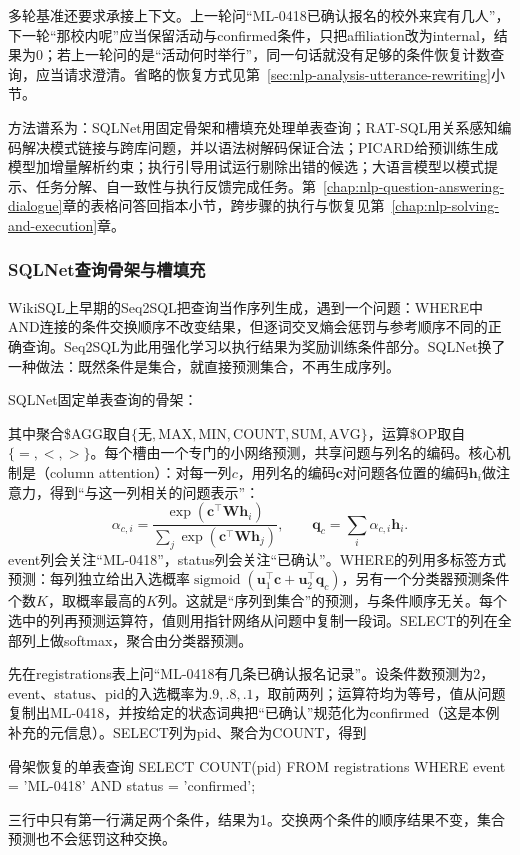 多轮基准还要求承接上下文。上一轮问“ML-0418已确认报名的校外来宾有几人”，下一轮“那校内呢”应当保留活动与confirmed条件，只把affiliation改为internal，结果为0；若上一轮问的是“活动何时举行”，同一句话就没有足够的条件恢复计数查询，应当请求澄清。省略的恢复方式见第~\ref{sec:nlp-analysis-utterance-rewriting}小节。

方法谱系为：SQLNet用固定骨架和槽填充处理单表查询；RAT-SQL用关系感知编码解决模式链接与跨库问题，并以语法树解码保证合法；PICARD给预训练生成模型加增量解析约束；执行引导用试运行剔除出错的候选；大语言模型以模式提示、任务分解、自一致性与执行反馈完成任务。第~\ref{chap:nlp-question-answering-dialogue}章的表格问答回指本小节，跨步骤的执行与恢复见第~\ref{chap:nlp-solving-and-execution}章。

\subsubsection{SQLNet查询骨架与槽填充}
\label{sec:nlp-analysis-sqlnet}

WikiSQL上早期的Seq2SQL把查询当作序列生成，遇到一个问题：WHERE中AND连接的条件交换顺序不改变结果，但逐词交叉熵会惩罚与参考顺序不同的正确查询。Seq2SQL为此用强化学习以执行结果为奖励训练条件部分。SQLNet换了一种做法：既然条件是集合，就直接预测集合，不再生成序列。

SQLNet固定单表查询的骨架：
其中聚合\$AGG取自$\{,,,,,\}$，运算\$OP取自$\{=,<,>\}$。每个槽由一个专门的小网络预测，共享问题与列名的编码。核心机制是（column attention）：对每一列$c$，用列名的编码$\bm c$对问题各位置的编码$\bm h_i$做注意力，得到“与这一列相关的问题表示”：
\[
 \alpha_{c,i}=
 \frac{\exp(\bm c^{\top}\bm W\bm h_i)}
      {\sum_j\exp(\bm c^{\top}\bm W\bm h_j)},\qquad
 \bm q_c=\sum_i\alpha_{c,i}\bm h_i.
\]
event列会关注“ML-0418”，status列会关注“已确认”。WHERE的列用多标签方式预测：每列独立给出入选概率$(\bm u_1^{\top}\bm c+\bm u_2^{\top}\bm q_c)$，另有一个分类器预测条件个数$K$，取概率最高的$K$列。这就是“序列到集合”的预测，与条件顺序无关。每个选中的列再预测运算符，值则用指针网络从问题中复制一段词。SELECT的列在全部列上做softmax，聚合由分类器预测。

先在registrations表上问“ML-0418有几条已确认报名记录”。设条件数预测为2，event、status、pid的入选概率为$.9,.8,.1$，取前两列；运算符均为等号，值从问题复制出ML-0418，并按给定的状态词典把“已确认”规范化为confirmed（这是本例补充的元信息）。SELECT列为pid、聚合为COUNT，得到
\begin{codeblock}[language=SQL]{骨架恢复的单表查询}
SELECT COUNT(pid) FROM registrations
WHERE event = 'ML-0418' AND status = 'confirmed';
\end{codeblock}
三行中只有第一行满足两个条件，结果为1。交换两个条件的顺序结果不变，集合预测也不会惩罚这种交换。

